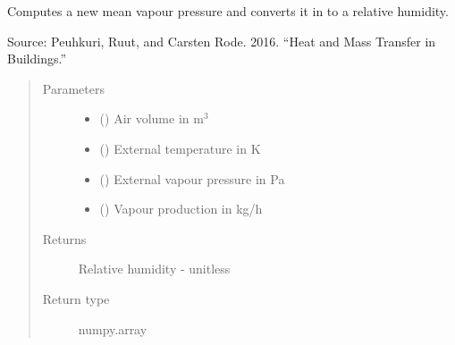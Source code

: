 \documentclass[letterpaper,10pt,english]{sphinxmanual}
\begin{document}
\begin{fulllineitems}
\label{\detokenize{air:livestock.air.new_mean_relative_humidity}}
Computes a new mean vapour pressure and converts it in to a relative humidity.

Source: Peuhkuri, Ruut, and Carsten Rode. 2016.
“Heat and Mass Transfer in Buildings.”
\begin{quote}\begin{description}
\item[{Parameters}] \leavevmode\begin{itemize}
\item {} 
 () \textendash{} Air volume in m$^{\text{3}}$

\item {} 
 () \textendash{} External temperature in K

\item {} 
 () \textendash{} External vapour pressure in Pa

\item {} 
 () \textendash{} Vapour production in kg/h

\end{itemize}

\item[{Returns}] \leavevmode
Relative humidity - unitless

\item[{Return type}] \leavevmode
numpy.array

\end{description}\end{quote}

\end{fulllineitems}

\end{document}
